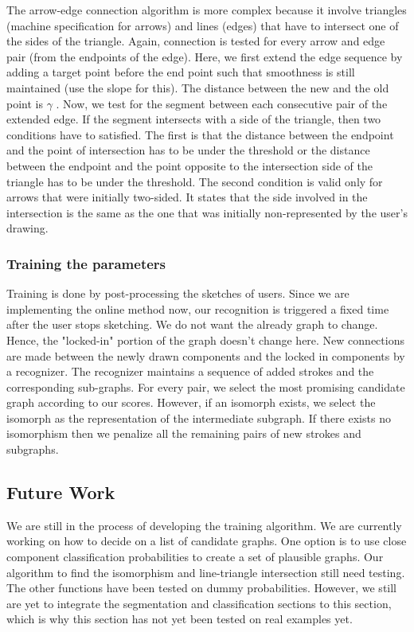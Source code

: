The arrow-edge connection algorithm is more complex because it involve triangles (machine specification for arrows) and lines (edges) that have to intersect one of the sides of the triangle. Again, connection is tested for every arrow and edge pair (from the endpoints of the edge). Here, we first extend the edge sequence by adding a target point before the end point such that smoothness is still maintained (use the slope for this). The distance between the new and the old point is $\gamma$ . Now, we test for the segment between each consecutive pair of the extended edge. If the segment intersects with a side of the triangle, then two conditions have to satisfied. The first is that the distance between the endpoint and the point of intersection has to be under the threshold or the distance between the endpoint and the point opposite to the intersection side of the triangle has to be under the threshold. The second condition is valid only for arrows that were initially two-sided. It states that the side involved in the intersection is the same as the one that was initially non-represented by the user's drawing.\\

\subsubsection{Training the parameters}

Training is done by post-processing the sketches of users. Since we are implementing the online method now, our recognition is triggered a fixed time after the user stops sketching. We do not want the already graph to change. Hence, the "locked-in" portion of the graph doesn't change here. New connections are made between the newly drawn components and the locked in components by a recognizer. The recognizer maintains a sequence of added strokes and the corresponding sub-graphs. For every pair, we select the most promising candidate graph according to our scores. However, if an isomorph exists, we select the isomorph as the representation of the intermediate subgraph. If there exists no isomorphism then we penalize all the remaining pairs of new strokes and subgraphs.\\

\subsection{Future Work}

We are still in the process of developing the training algorithm. We are currently working on how to decide on a list of candidate graphs. One option is to use close component classification probabilities to create a set of plausible graphs. Our algorithm to find the isomorphism and line-triangle intersection still need testing. The other functions have been tested on dummy probabilities. However, we still are yet to integrate the segmentation and classification sections to this section, which is why this section has not yet been tested on real examples yet.\\

